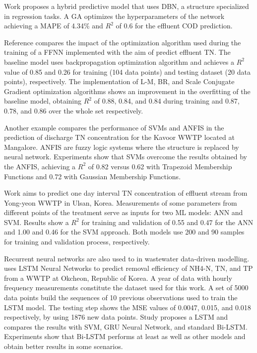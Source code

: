 Work \cite{Niu2020} proposes a hybrid predictive model that uses \ac{DBN}, a  structure specialized in regression tasks. A \ac{GA} optimizes the hyperparameters of the network achieving a \ac{MAPE} of 4.34\% and \begin{math}R^2\end{math} of 0.6 for the effluent \ac{COD} prediction.

Reference \cite{Zhao2021} compares the impact of the optimization algorithm used during the training of a \ac{FFNN} implemented with the aim of predict effluent \ac{TN}. The baseline model uses backpropagation optimization algorithm and achieves a \begin{math}R^2\end{math} value of 0.85 and 0.26 for training (104 data points) and testing dataset (20 data points), respectively. The implementation of \ac{L-M}, \ac{BR}, and Scale Conjugate Gradient optimization algorithms shows an improvement in the overfitting of the baseline model, obtaining \begin{math}R^2\end{math} of 0.88, 0.84, and 0.84 during training and 0.87, 0.78, and 0.86 over the whole set respectively.

Another example \cite{Manu2017} compares the performance of  \ac{SVM}s and \ac{ANFIS} in the prediction of discharge \ac{TN} concentration for the Kavoor \ac{WWTP} located at Mangalore. \ac{ANFIS} are fuzzy logic systems where the structure is replaced by neural network. Experiments show that \ac{SVM}s overcome the results obtained by the \ac{ANFIS}, achieving a \begin{math}R^2\end{math} of 0.82 versus 0.62 with Trapezoid Membership Functions and 0.72 with Gaussian Membership Functions. 

Work \cite{Guo2015} aims to predict one day interval \ac{TN} concentration of effluent stream from Yong-yeon \ac{WWTP} in Ulsan, Korea. Measurements of some parameters from different points of the treatment serve as inputs for two \ac{ML} models: \ac{ANN} and \ac{SVM}. Results show a \begin{math}R^2\end{math} for training and validation of 0.55 and 0.47 for the \ac{ANN} and 1.00 and 0.46 for the \ac{SVM} approach. Both models use 200 and 90 samples for training and validation process, respectively.

Recurrent neural networks are also used to in wastewater data-driven modelling. \cite{Yaqub2020} uses \ac{LSTM} Neural Networks to predict removal efficiency of NH4-N, \ac{TN}, and \ac{TP} from a \ac{WWTP} at Okcheon, Republic of Korea. A year of data with hourly frequency measurements constitute the dataset used for this work. A set of 5000 data points build the sequences of 10 previous observations used to train the  \ac{LSTM} model. The testing step shows the \ac{MSE} values of 0.0047, 0.015, and 0.018 respectively, by using 1876 new data points. Study \cite{Kang2020} proposes a \ac{LSTM} and compares the results with \ac{SVM}, \ac{GRU} Neural Network, and standard  \ac{Bi-LSTM}. Experiments show that \ac{Bi-LSTM} performs at least as well as other models and obtain better results in some scenarios.

